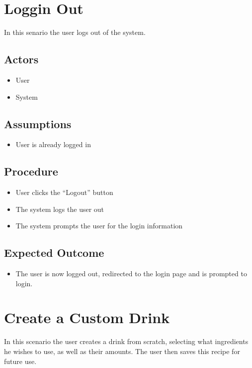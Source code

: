 {    \section{Loggin Out}
        In this senario the user logs out of the system.
        \subsection{Actors}
            \begin{itemize}
                \item User
                \item System
            \end{itemize}
        \subsection{Assumptions}
            \begin{itemize}
                \item User is already logged in
            \end{itemize}
        \subsection{Procedure}
            \begin{itemize}
                \item User clicks the ``Logout'' button
                \item The system logs the user out
                \item The system prompts the user for the login information
            \end{itemize}
        \subsection{Expected Outcome}
            \begin{itemize}
                \item The user is now logged out, redirected to the login page
                and is prompted to login.
            \end{itemize}

    \section{Create a Custom Drink}
        In this scenario the user creates a drink from scratch, selecting 
        what ingredients he wishes to use, as well as their amounts. The 
        user then saves this recipe for future use.
}
